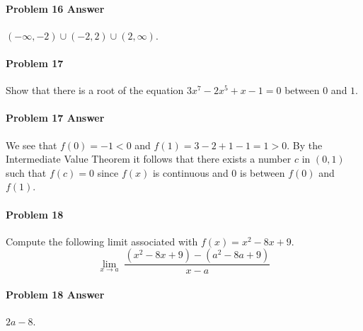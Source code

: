 \documentclass[a4paper, 11pt]{article}
\begin{document}

\paragraph{Problem 16 Answer} \; $(-\infty, -2) \cup (-2,2) \cup (2, \infty)$.


\paragraph{Problem 17}
Show that there is a root of the equation $3x^7 - 2x^5 + x -1 = 0$ between $0$ and $1$.


\paragraph{Problem 17 Answer}
We see that $f(0) = -1 < 0$ and $f(1) = 3 - 2 + 1 - 1 = 1 > 0$.
By the Intermediate Value Theorem it follows that there exists a number $c$ in $(0,1)$ such that $f(c)=0$ since $f(x)$ is continuous and 0 is between $f(0)$ and $f(1)$.


\paragraph{Problem 18}
Compute the following limit associated with $f(x) = x^2 - 8x + 9$.
\[
	\lim_{x\rightarrow a} \; \frac{(x^2-8x+9)-(a^2-8a+9)}{x-a}
\]


\paragraph{Problem 18 Answer}
\; $2a - 8$.

\end{document}
